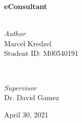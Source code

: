 \documentclass{article}
\begin{document}
\begin{titlepage}
	{\huge\bfseries eConsultant}\\[0.4cm] %
	
	\HRule\\[1.5cm]
	
	
	\begin{minipage}{0.4\textwidth}
		\begin{flushleft}
			\large
			\textit{Author}\\
			Marcel Kredzel\\ Student ID: M00540191
		\end{flushleft}
	\end{minipage}
	~
	\begin{minipage}{0.4\textwidth}
		\begin{flushright}
			\large
			\textit{Supervisor}\\
			Dr. David Gamez %
		\end{flushright}
	\end{minipage}
	
	
	
	\vfill\vfill
	
	{\large April 30, 2021}
	
	\vfill
	
\end{titlepage}
\end{document}
